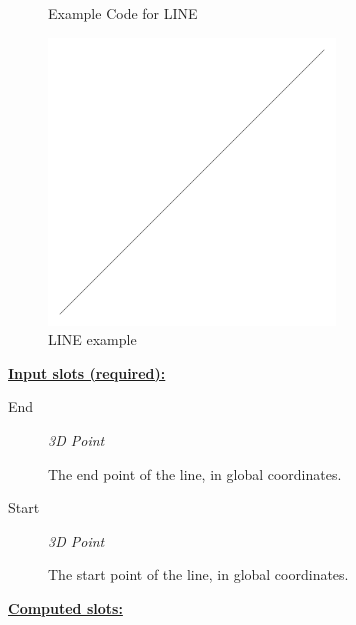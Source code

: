 \documentclass [11pt]{book}
\begin{document}
\begin{itemize}
\begin{figure}
\caption{Example Code for LINE}

\label{fig:example-code-LINE}

\end{figure}

\begin{figure}
\begin{center}
\includegraphics[width=3in,height=3in]{../images/example-LINE.pdf}
\end{center}

\caption{LINE example}

\label{fig:LINE}

\end{figure}





\textbf{
\underline{Input slots (required):}}

\begin{description}

\item [End]
\emph{3D Point}

 The end point of the line, in global coordinates.




\item [Start]
\emph{3D Point}

 The start point of the line, in global coordinates.




\end{description}






\textbf{
\underline{Computed slots:}}

\begin{description}


\end{description}
\end{itemize}
\end{document}
